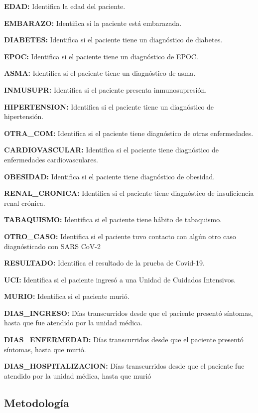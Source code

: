 \documentclass[]{article}
\begin{document}
\textbf{EDAD:} Identifica la edad del paciente.

\textbf{EMBARAZO:} Identifica si la paciente está embarazada.

\textbf{DIABETES:} Identifica si el paciente tiene un diagnóstico de
diabetes.

\textbf{EPOC:} Identifica si el paciente tiene un diagnóstico de EPOC.

\textbf{ASMA:} Identifica si el paciente tiene un diagnóstico de asma.

\textbf{INMUSUPR:} Identifica si el paciente presenta inmunosupresión.

\textbf{HIPERTENSION:} Identifica si el paciente tiene un diagnóstico de
hipertensión.

\textbf{OTRA\_COM:} Identifica si el paciente tiene diagnóstico de otras
enfermedades.

\textbf{CARDIOVASCULAR:} Identifica si el paciente tiene diagnóstico de
enfermedades cardiovasculares.

\textbf{OBESIDAD:} Identifica si el paciente tiene diagnóstico de
obesidad.

\textbf{RENAL\_CRONICA:} Identifica si el paciente tiene diagnóstico de
insuficiencia renal crónica.

\textbf{TABAQUISMO:} Identifica si el paciente tiene hábito de
tabaquismo.

\textbf{OTRO\_CASO:} Identifica si el paciente tuvo contacto con algún
otro caso diagnósticado con SARS CoV-2

\textbf{RESULTADO:} Identifica el resultado de la prueba de Covid-19.

\textbf{UCI:} Identifica si el paciente ingresó a una Unidad de Cuidados
Intensivos.

\textbf{MURIO:} Identifica si el paciente murió.

\textbf{DIAS\_INGRESO:} Días transcurridos desde que el paciente
presentó síntomas, hasta que fue atendido por la unidad médica.

\textbf{DIAS\_ENFERMEDAD:} Días transcurridos desde que el paciente
presentó síntomas, hasta que murió.

\textbf{DIAS\_HOSPITALIZACION:} Días transcurridos desde que el paciente
fue atendido por la unidad médica, hasta que murió

\hypertarget{metodologuxeda}{%
\subsection{Metodología}\label{metodologuxeda}}
\end{document}
